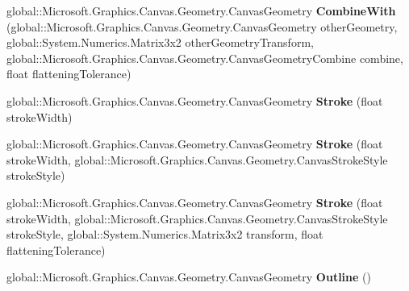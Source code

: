\begin{DoxyCompactItemize}
\item 
\mbox{\label{interface_microsoft_1_1_graphics_1_1_canvas_1_1_geometry_1_1_i_canvas_geometry_a9dbfa5fa955580afeef0c2a26e0281b9}} 
global\+::\+Microsoft.\+Graphics.\+Canvas.\+Geometry.\+Canvas\+Geometry {\bfseries Combine\+With} (global\+::\+Microsoft.\+Graphics.\+Canvas.\+Geometry.\+Canvas\+Geometry other\+Geometry, global\+::\+System.\+Numerics.\+Matrix3x2 other\+Geometry\+Transform, global\+::\+Microsoft.\+Graphics.\+Canvas.\+Geometry.\+Canvas\+Geometry\+Combine combine, float flattening\+Tolerance)
\item 
\mbox{\label{interface_microsoft_1_1_graphics_1_1_canvas_1_1_geometry_1_1_i_canvas_geometry_a9bbabef2bcb23c5f82d026f2b161dac4}} 
global\+::\+Microsoft.\+Graphics.\+Canvas.\+Geometry.\+Canvas\+Geometry {\bfseries Stroke} (float stroke\+Width)
\item 
\mbox{\label{interface_microsoft_1_1_graphics_1_1_canvas_1_1_geometry_1_1_i_canvas_geometry_a6ddac698f9eed90fcbbee6f511c98099}} 
global\+::\+Microsoft.\+Graphics.\+Canvas.\+Geometry.\+Canvas\+Geometry {\bfseries Stroke} (float stroke\+Width, global\+::\+Microsoft.\+Graphics.\+Canvas.\+Geometry.\+Canvas\+Stroke\+Style stroke\+Style)
\item 
\mbox{\label{interface_microsoft_1_1_graphics_1_1_canvas_1_1_geometry_1_1_i_canvas_geometry_ac124844233277683b138a1178fe818ad}} 
global\+::\+Microsoft.\+Graphics.\+Canvas.\+Geometry.\+Canvas\+Geometry {\bfseries Stroke} (float stroke\+Width, global\+::\+Microsoft.\+Graphics.\+Canvas.\+Geometry.\+Canvas\+Stroke\+Style stroke\+Style, global\+::\+System.\+Numerics.\+Matrix3x2 transform, float flattening\+Tolerance)
\item 
\mbox{\label{interface_microsoft_1_1_graphics_1_1_canvas_1_1_geometry_1_1_i_canvas_geometry_a7b1a716eb0cbfbd552347d14e00268b7}} 
global\+::\+Microsoft.\+Graphics.\+Canvas.\+Geometry.\+Canvas\+Geometry {\bfseries Outline} ()
\item 

\end{DoxyCompactItemize}
